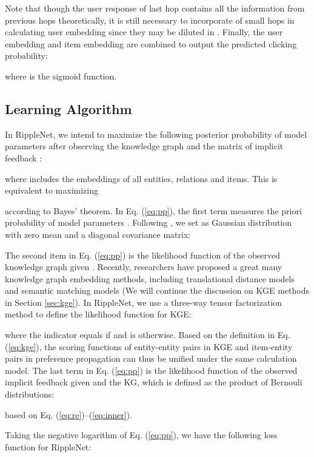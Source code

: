\documentclass[sigconf]{acmart}
\begin{document}
Note that though the user response of last hop  contains all the information from previous hops theoretically, it is still necessary to incorporate  of small hops  in calculating user embedding since they may be diluted in .
		Finally, the user embedding and item embedding are combined to output the predicted clicking probability:
		
		where  is the sigmoid function.
		
		
	
	\subsection{Learning Algorithm}
		In RippleNet, we intend to maximize the following posterior probability of model parameters  after observing the knowledge graph  and the matrix of implicit feedback :
		
		where  includes the embeddings of all entities, relations and items.
		This is equivalent to maximizing
		
		according to Bayes' theorem.
		In Eq. (\ref{eq:pp}), the first term  measures the priori probability of model parameters .
		Following \cite{zhang2016collaborative}, we set  as Gaussian distribution with zero mean and a diagonal covariance matrix:
		
		The second item in Eq. (\ref{eq:pp}) is the likelihood function of the observed knowledge graph  given .
		Recently, researchers have proposed a great many knowledge graph embedding methods, including translational distance models \cite{bordes2013translating,lin2015learning} and semantic matching models \cite{nickel2016holographic,liu2017analogical} (We will continue the discussion on KGE methods in Section \ref{sec:kge}).
		In RippleNet, we use a three-way tensor factorization method to define the likelihood function for KGE:
		
		where the indicator  equals  if  and is  otherwise.
		Based on the definition in Eq. (\ref{eq:kge}), the scoring functions of entity-entity pairs in KGE and item-entity pairs in preference propagation can thus be unified under the same calculation model.
		The last term in Eq. (\ref{eq:pp}) is the likelihood function of the observed implicit feedback given  and the KG, which is defined as the product of Bernouli distributions:
		
		based on Eq. (\ref{eq:re})--(\ref{eq:inner}).
		
		Taking the negative logarithm of Eq. (\ref{eq:pp}), we have the following loss function for RippleNet:
		
\end{document}
